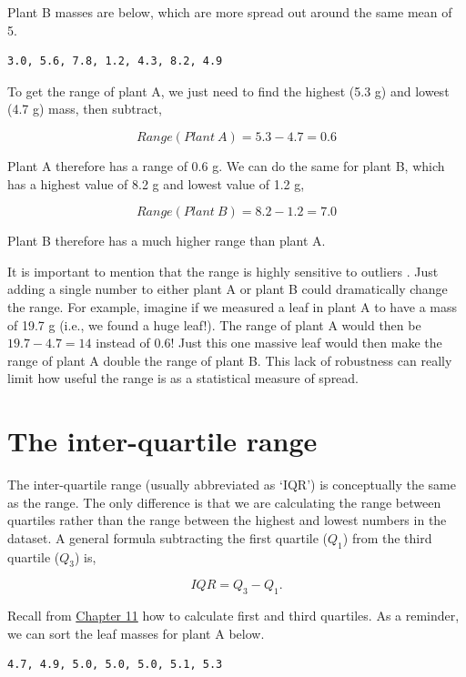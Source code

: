 \documentclass[
]{scrbook}
\begin{document}
Plant B masses are below, which are more spread out around the same mean of 5.

\begin{verbatim}
3.0, 5.6, 7.8, 1.2, 4.3, 8.2, 4.9
\end{verbatim}

To get the range of plant A, we just need to find the highest (5.3 g) and lowest (4.7 g) mass, then subtract,

\[Range(Plant\:A) = 5.3 - 4.7 = 0.6\]

Plant A therefore has a range of 0.6 g.
We can do the same for plant B, which has a highest value of 8.2 g and lowest value of 1.2 g,

\[Range(Plant\:B) = 8.2 - 1.2 = 7.0\]

Plant B therefore has a much higher range than plant A.

It is important to mention that the range is highly sensitive to outliers \citep{Navarro2022}.
Just adding a single number to either plant A or plant B could dramatically change the range.
For example, imagine if we measured a leaf in plant A to have a mass of 19.7 g (i.e., we found a huge leaf!).
The range of plant A would then be \(19.7 - 4.7 = 14\) instead of 0.6!
Just this one massive leaf would then make the range of plant A double the range of plant B.
This lack of robustness can really limit how useful the range is as a statistical measure of spread.

\hypertarget{the-inter-quartile-range}{%
\section{The inter-quartile range}\label{the-inter-quartile-range}}

The inter-quartile range (usually abbreviated as `IQR') is conceptually the same as the range.
The only difference is that we are calculating the range between quartiles rather than the range between the highest and lowest numbers in the dataset.
A general formula subtracting the first quartile (\(Q_{1}\)) from the third quartile (\(Q_{3}\)) is,

\[IQR = Q_{3} - Q_{1}.\]

Recall from \protect\hyperlink{Chapter_11}{Chapter 11} how to calculate first and third quartiles.
As a reminder, we can sort the leaf masses for plant A below.

\begin{verbatim}
4.7, 4.9, 5.0, 5.0, 5.0, 5.1, 5.3
\end{verbatim}
\end{document}
